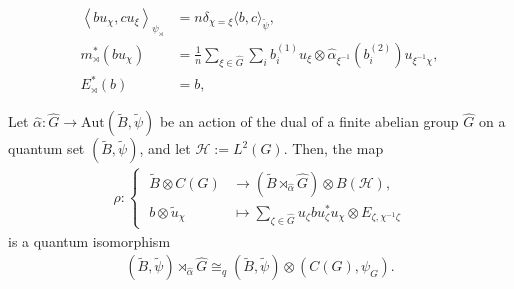 \documentclass[10pt,a4paper]{amsart}
\begin{document}
    \begin{align}
        \label{land::eq:formula_for_scalar_product_on_crossed_product_algebra}
        \left\langle b u_\chi, c u_\xi \right\rangle_{\psi_\rtimes} 
        &= n \delta_{\chi=\xi} \langle b, c \rangle_{\tilde{\psi}}, \\
        \label{land::eq:comultiplication_formula_on_crossed_product}
        m_\rtimes^\ast\left(b u_\chi\right) &= \frac{1}{n} \sum_{\xi \in \hat{G}} \sum_i b_i^{(1)} u_\xi \otimes \hat{\alpha}_{\xi^{-1}}(b_i^{(2)}) u_{\xi^{-1} \chi}, \\
        \label{eq:formula_for_E*}
        E_\rtimes^\ast(b) &= b,
    \end{align}

\begin{proposition}
    \label{land::prop:quantum_isomorphism_between_crossed_product_and_tensor_product}
    Let $\hat{\alpha}: \hat{G} \to \mathrm{Aut}(\tilde{B}, \tilde{\psi})$ be an action of the dual of a finite abelian group $\hat{G}$ on a quantum set $(\tilde{B}, \tilde{\psi})$, and let $\mathcal{H} := L^2(G)$.
    Then, the map
    \begin{align*}
        \rho: \left\{ \;
        \begin{aligned}   
            \tilde{B} \otimes C(G) &\to \left(\tilde{B} \rtimes_{\hat{\alpha}} \hat{G}\right) \otimes B(\mathcal{H}), \\
            b \otimes \tilde{u}_\chi &\mapsto \sum_{\zeta \in \hat{G}} u_\zeta b u_\zeta^\ast u_\chi \otimes E_{\zeta, \chi^{-1} \zeta}
        \end{aligned}\right.
    \end{align*}
    is a quantum isomorphism
    \begin{align*}
        (\tilde{B}, \tilde{\psi}) \rtimes_{\hat{\alpha}} \hat{G} \cong_q (\tilde{B}, \tilde{\psi}) \otimes (C(G), \psi_G).
    \end{align*}
\end{proposition}
\end{document}
